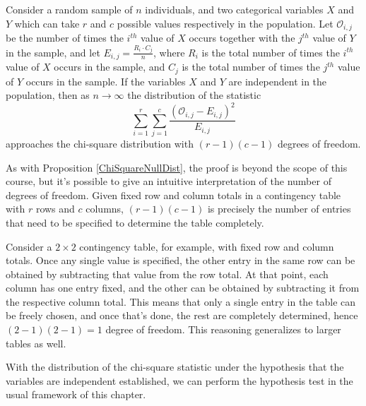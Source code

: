 \begin{proposition}
Consider a random sample of $n$ individuals, and two categorical variables $X$ and $Y$ which can take $r$ and $c$ possible values respectively in the population. Let $\mathcal{O}_{i,j}$ be the number of times the $i^{th}$ value of $X$ occurs together with the $j^{th}$ value of $Y$ in the sample, and let $E_{i,j} = \frac{R_i \cdot C_j}{n}$, where $R_i$ is the total number of times the $i^{th}$ value of $X$ occurs in the sample, and $C_j$ is the total number of times the $j^{th}$ value of $Y$ occurs in the sample. If the variables $X$ and $Y$ are independent in the population, then as $n \to \infty$ the distribution of the statistic 
$$\sum_{i=1}^r\sum_{j=1}^c \frac{(\mathcal{O}_{i,j} - E_{i,j})^2}{E_{i,j}}$$
approaches the chi-square distribution with $(r-1)(c-1)$ degrees of freedom.
\end{proposition}

As with Proposition \ref{ChiSquareNullDist}, the proof is beyond the scope of this course, but it's possible to give an intuitive interpretation of the number of degrees of freedom. Given fixed row and column totals in a contingency table with $r$ rows and $c$ columns, $(r-1)(c-1)$ is precisely the number of entries that need to be specified to determine the table completely. 

Consider a $2 \times 2$ contingency table, for example, with fixed row and column totals. Once any single value is specified, the other entry in the same row can be obtained by subtracting that value from the row total. At that point, each column has one entry fixed, and the other can be obtained by subtracting it from the respective column total. This means that only a single entry in the table can be freely chosen, and once that's done, the rest are completely determined, hence $(2-1)(2-1) = 1$ degree of freedom. This reasoning generalizes to larger tables as well.

With the distribution of the chi-square statistic under the hypothesis that the variables are independent established, we can perform the hypothesis test in the usual framework of this chapter.

